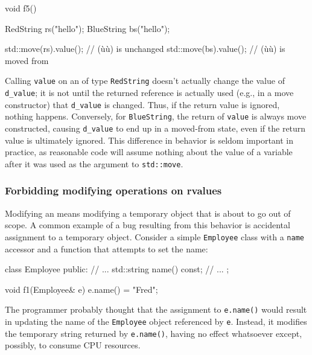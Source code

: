 \begin{emcppslisting}
void f5()
{
    RedString  rs("hello");
    BlueString bs("hello");

    std::move(rs).value();  // (ù{}ù) is unchanged
    std::move(bs).value();  // (ù{}ù) is moved from
}
\end{emcppslisting}
    

\noindent Calling \lstinline!value! on an  of type \lstinline!RedString!
doesn't actually change the value of \lstinline!d_value!; it is not until
the returned  reference is actually used (e.g., in a move
constructor) that \lstinline!d_value! is changed. Thus, if the return
value is ignored, nothing happens. Conversely, for \lstinline!BlueString!,
the return of \lstinline!value! is always move constructed, causing
\lstinline!d_value! to end up in a moved-from state, even if the return
value is ultimately ignored. This difference in behavior is seldom
important in practice, as reasonable code will assume nothing about the
value of a variable after it was used as the argument to
\lstinline!std::move!.

\subsubsection[Forbidding modifying operations on \romeovalue{rvalues}]{Forbidding modifying operations on {\sfbsubsubsecitalRomeo rvalues}}\label{forbidding-modifying-operations-on-rvalues}

Modifying an  means modifying a temporary object that is
about to go out of scope. A common example of a bug resulting from this
behavior is accidental assignment to a temporary object. Consider a
simple \lstinline!Employee! class with a \lstinline!name! accessor and a
function that attempts to set the name:

\begin{emcppslisting}
class Employee
{
public:
    // ...
    std::string name() const;
    // ...
};

void f1(Employee& e)
{
    e.name() = "Fred";
}
\end{emcppslisting}
    

\noindent The programmer probably thought that the assignment to \lstinline!e.name()!
would result in updating the name of the \lstinline!Employee! object
referenced by \lstinline!e!. Instead, it modifies the temporary string
returned by \lstinline!e.name()!, having no effect whatsoever except,
possibly, to consume CPU resources.

